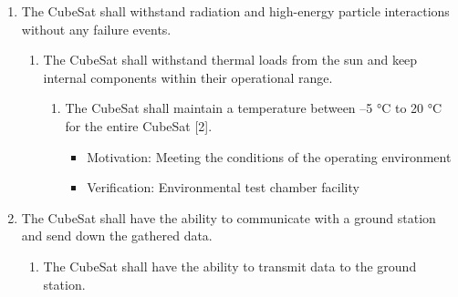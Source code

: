 \begin{enumerate}
    \begin{enumerate}
        \item The solar panels shall collect energy from the sun to distribute throughout the CubeSat by the power management system.
        \begin{enumerate}
            \item The battery shall be charged by the solar panels and used only when the power management system cannot distribute enough power harnessed from the solar panels. 
                \begin{itemize}
                    \item Motivation: Maintaining the power required needed for all subsystems of the CubeSat
                    \item Verification: Environmental test chamber facility focuses on power management
                \end{itemize}
        \end{enumerate}
    \end{enumerate} %
    \item The CubeSat shall withstand radiation and high-energy particle interactions without any failure events. 
    \begin{enumerate}
        \item The CubeSat shall withstand thermal loads from the sun and keep internal components within their operational range. 
        \begin{enumerate}
            \item The CubeSat shall maintain a temperature between –5 °C to 20 °C for the entire CubeSat [2].  
                \begin{itemize}
                    \item Motivation: Meeting the conditions of the operating environment
                    \item Verification: Environmental test chamber facility 
                \end{itemize}
        \end{enumerate}
    \end{enumerate} %
    \item The CubeSat shall have the ability to communicate with a ground station and send down the gathered data.
    \begin{enumerate}
        \item The CubeSat shall have the ability to transmit data to the ground station.
        \begin{enumerate}

\end{enumerate}
\end{enumerate}
\end{enumerate}
